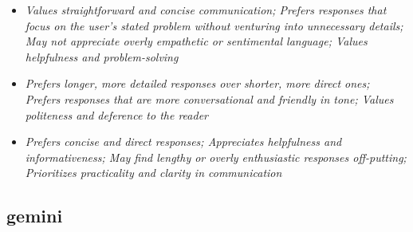 \documentclass[11pt]{article}
\newcommand{\profiletext}[1]{\textit{#1}}
\begin{document}
\begin{itemize}
\item \profiletext{Values straightforward and concise communication; Prefers responses that focus on the user's stated problem without venturing into unnecessary details; May not appreciate overly empathetic or sentimental language; Values helpfulness and problem-solving}
\item \profiletext{Prefers longer, more detailed responses over shorter, more direct ones; Prefers responses that are more conversational and friendly in tone; Values politeness and deference to the reader}
\item \profiletext{Prefers concise and direct responses; Appreciates helpfulness and informativeness; May find lengthy or overly enthusiastic responses off-putting; Prioritizes practicality and clarity in communication}
\end{itemize}

\subsection{gemini}
\end{document}
